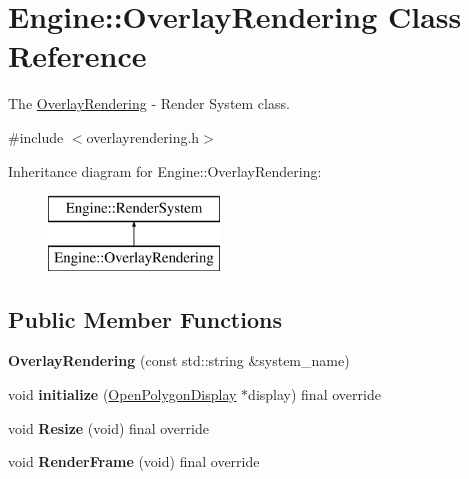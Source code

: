 \hypertarget{classEngine_1_1OverlayRendering}{}\section{Engine\+:\+:Overlay\+Rendering Class Reference}
\label{classEngine_1_1OverlayRendering}


The \hyperlink{classEngine_1_1OverlayRendering}{Overlay\+Rendering} -\/ Render System class.  




{\ttfamily \#include $<$overlayrendering.\+h$>$}

Inheritance diagram for Engine\+:\+:Overlay\+Rendering\+:\begin{figure}[H]
\begin{center}
\leavevmode
\includegraphics[height=2.000000cm]{classEngine_1_1OverlayRendering}
\end{center}
\end{figure}
\subsection*{Public Member Functions}
\begin{DoxyCompactItemize}
\item 
\hypertarget{classEngine_1_1OverlayRendering_ad6d1f4ae353491c18495a81572d20830}{}{\bfseries Overlay\+Rendering} (const std\+::string \&system\+\_\+name)\label{classEngine_1_1OverlayRendering_ad6d1f4ae353491c18495a81572d20830}

\item 
\hypertarget{classEngine_1_1OverlayRendering_afaf22f8cda0527df0b85dbce6ce5beb5}{}void {\bfseries initialize} (\hyperlink{classEngine_1_1OpenPolygonDisplay}{Open\+Polygon\+Display} $\ast$display) final override\label{classEngine_1_1OverlayRendering_afaf22f8cda0527df0b85dbce6ce5beb5}

\item 
\hypertarget{classEngine_1_1OverlayRendering_a650f19b77f1ec53974c6bbeb3b56e820}{}void {\bfseries Resize} (void) final override\label{classEngine_1_1OverlayRendering_a650f19b77f1ec53974c6bbeb3b56e820}

\item 
\hypertarget{classEngine_1_1OverlayRendering_a47c202597985d5a807c58fa4d72deba4}{}void {\bfseries Render\+Frame} (void) final override\label{classEngine_1_1OverlayRendering_a47c202597985d5a807c58fa4d72deba4}

\end{DoxyCompactItemize}
